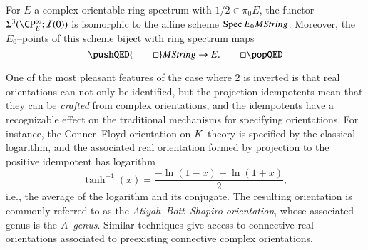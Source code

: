 \begin{corollary}\label{OddPrimaryMStringTriumvirate}
For $E$ a complex-orientable ring spectrum with $1/2 \in \pi_0 E$, the functor $\Sigma^3(\CP^\infty_E; \sheaf I(0))$ is isomorphic to the affine scheme $\operatorname{Spec} E_0 M\mathit{String}$.  Moreover, the $E_0$--points of this scheme biject with ring spectrum maps \[\pushQED{\qed}M\String \to E. \qedhere \popQED\]
\end{corollary}

\begin{remark}
One of the most pleasant features of the case where $2$ is inverted is that real orientations can not only be identified, but the projection idempotents mean that they can be \emph{crafted} from complex orientations, and the idempotents have a recognizable effect on the traditional mechanisms for specifying orientations.  For instance, the Conner--Floyd orientation on $K$--theory is specified by the classical logarithm, and the associated real orientation formed by projection to the positive idempotent has logarithm \[\operatorname{tanh}^{-1}(x) = \frac{-\ln(1 - x) + \ln(1 + x)}{2},\] i.e., the average of the logarithm and its conjugate.  The resulting orientation is commonly referred to as the \textit{Atiyah--Bott--Shapiro orientation}, whose associated genus is the \textit{$\widehat A$--genus}.  Similar techniques give access to connective real orientations associated to preexisting connective complex orientations.
\end{remark}

